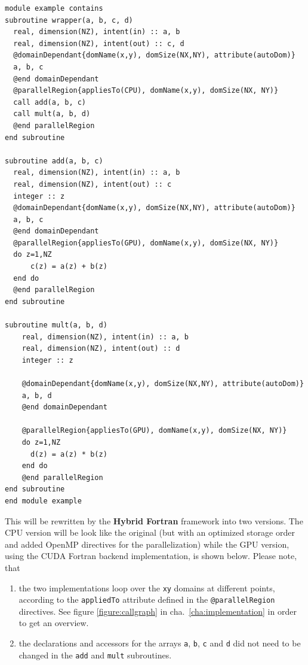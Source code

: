 \begin{lstlisting}[name=example, label=listing:example, caption={example of a Hybrid Fortran subroutine with a parallel region}]
module example contains
subroutine wrapper(a, b, c, d)
  real, dimension(NZ), intent(in) :: a, b
  real, dimension(NZ), intent(out) :: c, d
  @domainDependant{domName(x,y), domSize(NX,NY), attribute(autoDom)}
  a, b, c
  @end domainDependant
  @parallelRegion{appliesTo(CPU), domName(x,y), domSize(NX, NY)}
  call add(a, b, c)
  call mult(a, b, d)
  @end parallelRegion
end subroutine

subroutine add(a, b, c)
  real, dimension(NZ), intent(in) :: a, b
  real, dimension(NZ), intent(out) :: c
  integer :: z
  @domainDependant{domName(x,y), domSize(NX,NY), attribute(autoDom)}
  a, b, c
  @end domainDependant
  @parallelRegion{appliesTo(GPU), domName(x,y), domSize(NX, NY)}
  do z=1,NZ
      c(z) = a(z) + b(z)
  end do
  @end parallelRegion
end subroutine

subroutine mult(a, b, d)
    real, dimension(NZ), intent(in) :: a, b
    real, dimension(NZ), intent(out) :: d
    integer :: z

    @domainDependant{domName(x,y), domSize(NX,NY), attribute(autoDom)}
    a, b, d
    @end domainDependant

    @parallelRegion{appliesTo(GPU), domName(x,y), domSize(NX, NY)}
    do z=1,NZ
      d(z) = a(z) * b(z)
    end do
    @end parallelRegion
end subroutine
end module example
\end{lstlisting}

This will be rewritten by the \textbf{Hybrid Fortran} framework into two versions. The CPU version will be look like the original (but with an optimized storage order and added OpenMP directives for the parallelization) while the GPU version, using the CUDA Fortran backend implementation, is shown below. Please note, that
\begin{enumerate}
 \item the two implementations loop over the \verb|xy| domains at different points, according to the \verb|appliedTo| attribute defined in the \verb|@parallelRegion| directives. See figure \ref{figure:callgraph} in cha.~\ref{cha:implementation} in order to get an overview.
 \item the declarations and accessors for the arrays \verb|a|, \verb|b|, \verb|c| and \verb|d| did not need to be changed in the \verb|add| and \verb|mult| subroutines.
\end{enumerate}

